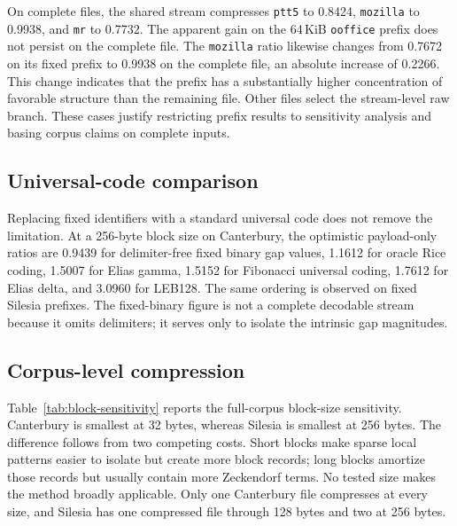 \documentclass[a4paper,fleqn]{cas-dc}
\begin{document}
On complete files, the shared stream compresses \texttt{ptt5} to 0.8424,
\texttt{mozilla} to 0.9938, and \texttt{mr} to 0.7732. The apparent gain on
the 64\,KiB \texttt{ooffice} prefix does not persist on the complete file.
The \texttt{mozilla} ratio likewise changes from 0.7672 on its fixed prefix to
0.9938 on the complete file, an absolute increase of 0.2266. This change
indicates that the prefix has a substantially higher concentration of
favorable structure than the remaining file. Other files select the stream-level
raw branch. These cases justify restricting prefix results to sensitivity
analysis and basing corpus claims on complete inputs.

\subsection{Universal-code comparison}

Replacing fixed identifiers with a standard universal code does not remove
the limitation. At a 256-byte block size on Canterbury, the optimistic
payload-only ratios are 0.9439 for delimiter-free fixed binary gap values,
1.1612 for oracle Rice coding, 1.5007 for Elias gamma, 1.5152 for Fibonacci
universal coding, 1.7612 for Elias delta, and 3.0960 for LEB128. The same
ordering is observed on fixed Silesia prefixes. The fixed-binary figure is not a
complete decodable stream because it omits delimiters; it serves only to
isolate the intrinsic gap magnitudes.

\subsection{Corpus-level compression}

Table~\ref{tab:block-sensitivity} reports the full-corpus block-size
sensitivity. Canterbury is smallest at 32 bytes, whereas Silesia is smallest
at 256 bytes. The difference follows from two competing costs. Short blocks
make sparse local patterns easier to isolate but create more block records;
long blocks amortize those records but usually contain more Zeckendorf terms.
No tested size makes the method broadly applicable. Only one Canterbury file
compresses at every size, and Silesia has one compressed file through
128 bytes and two at 256 bytes.
\end{document}
